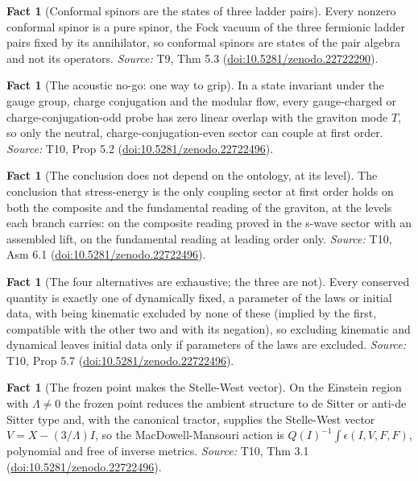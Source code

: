 \documentclass[11pt]{article}
\theoremstyle{definition}
\newtheorem{fact}[theorem]{Fact}
\theoremstyle{plain}
\begin{document}
\begin{fact}[Conformal spinors are the states of three ladder pairs]\label{c:correspondence.twistors-are-states-three-ladder-pairs}
Every nonzero conformal spinor is a pure spinor, the Fock vacuum of the three fermionic ladder pairs fixed by its annihilator, so conformal spinors are states of the pair algebra and not its operators.
\emph{Source:} T9, Thm 5.3 (\href{https://doi.org/10.5281/zenodo.22722290}{doi:10.5281/zenodo.22722290}).
\end{fact}

\begin{fact}[The acoustic no-go: one way to grip]\label{c:dark-energy.acoustic-no-go-one-way-grip}
In a state invariant under the gauge group, charge conjugation and the modular flow, every gauge-charged or charge-conjugation-odd probe has zero linear overlap with the graviton mode $T$, so only the neutral, charge-conjugation-even sector can couple at first order.
\emph{Source:} T10, Prop 5.2 (\href{https://doi.org/10.5281/zenodo.22722496}{doi:10.5281/zenodo.22722496}).
\end{fact}

\begin{fact}[The conclusion does not depend on the ontology, at its level]\label{c:dark-energy.conclusion-does-not-depend-ontology-level}
The conclusion that stress-energy is the only coupling sector at first order holds on both the composite and the fundamental reading of the graviton, at the levels each branch carries: on the composite reading proved in the s-wave sector with an assembled lift, on the fundamental reading at leading order only.
\emph{Source:} T10, Asm 6.1 (\href{https://doi.org/10.5281/zenodo.22722496}{doi:10.5281/zenodo.22722496}).
\end{fact}

\begin{fact}[The four alternatives are exhaustive; the three are not]\label{c:dark-energy.four-alternatives-are-exhaustive-three-are}
Every conserved quantity is exactly one of dynamically fixed, a parameter of the laws or initial data, with being kinematic excluded by none of these (implied by the first, compatible with the other two and with its negation), so excluding kinematic and dynamical leaves initial data only if parameters of the laws are excluded.
\emph{Source:} T10, Prop 5.7 (\href{https://doi.org/10.5281/zenodo.22722496}{doi:10.5281/zenodo.22722496}).
\end{fact}

\begin{fact}[The frozen point makes the Stelle-West vector]\label{c:dark-energy.frozen-point-makes-stelle-west-vector}
On the Einstein region with $\Lambda\neq 0$ the frozen point reduces the ambient structure to de Sitter or anti-de Sitter type and, with the canonical tractor, supplies the Stelle-West vector $V = X - (3/\Lambda)I$, so the MacDowell-Mansouri action is $Q(I)^{-1}\int\epsilon(I,V,F,F)$, polynomial and free of inverse metrics.
\emph{Source:} T10, Thm 3.1 (\href{https://doi.org/10.5281/zenodo.22722496}{doi:10.5281/zenodo.22722496}).
\end{fact}
\end{document}

